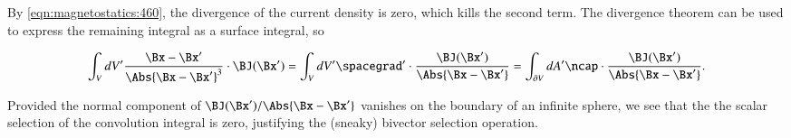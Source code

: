 By \cref{eqn:magnetostatics:460}, the divergence of the current density is zero, which kills the second term.  The divergence theorem can be used to express the remaining integral as a surface integral, so

\begin{dmath}\label{eqn:biotSavartGreens:100}
 \int_V dV' \frac{\Bx - \Bx'}{ \Abs{\Bx - \Bx'}^3 } \cdot \BJ(\Bx')
=  \int_V dV' \spacegrad' \cdot \frac{\BJ(\Bx')}{ \Abs{\Bx - \Bx'} }
=  \int_{\partial V} dA' \ncap \cdot \frac{\BJ(\Bx')}{ \Abs{\Bx - \Bx'} }.
\end{dmath}

Provided the normal component of \( \BJ(\Bx')/\Abs{\Bx - \Bx'} \) vanishes on the boundary of an infinite sphere, we see that the
the scalar selection of the convolution integral is zero, justifying the (sneaky) bivector selection operation.

